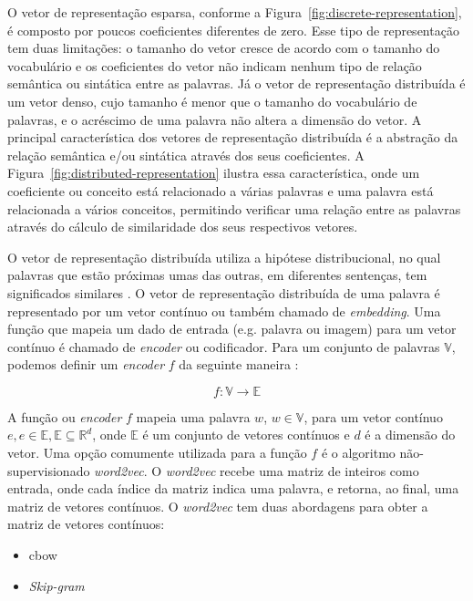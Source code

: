 O vetor de representação esparsa, conforme a Figura~\ref{fig:discrete-representation}, é composto por poucos coeficientes diferentes de zero. Esse tipo de representação tem duas limitações: o tamanho do vetor cresce de acordo com o tamanho do vocabulário e os coeficientes do vetor não indicam nenhum tipo de relação semântica ou sintática entre as palavras. Já o vetor de representação distribuída é um vetor denso, cujo tamanho é menor que o tamanho do vocabulário de palavras, e o acréscimo de uma palavra não altera a dimensão do vetor. A principal característica dos vetores de representação distribuída é a abstração da relação semântica e/ou sintática através dos seus coeficientes. A Figura~\ref{fig:distributed-representation} ilustra essa característica, onde um coeficiente ou conceito está relacionado a várias palavras e uma palavra está relacionada a vários conceitos, permitindo verificar uma relação entre as palavras através do cálculo de similaridade dos seus respectivos vetores.

 O vetor de representação distribuída utiliza a hipótese distribucional, no qual palavras que estão próximas umas das outras, em diferentes sentenças, tem significados similares \citep{Goodfellow-et-al-2016}. O vetor de representação distribuída de uma palavra é representado por um vetor contínuo ou também chamado de \textit{embedding}. Uma função que mapeia um dado de entrada (e.g. palavra ou imagem) para um vetor contínuo é chamado de \textit{encoder} ou codificador. Para um conjunto de palavras $\mathbb{V}$, podemos definir um \textit{encoder} $f$ da seguinte maneira \citep{cambronero-deep-learning-code-search:2019}:

\begin{equation}
    f: \mathbb{V} \rightarrow \mathbb{E}
\end{equation}

A função ou \textit{encoder} $f$ mapeia uma palavra $w$, $w \in \mathbb{V}$, para um vetor contínuo $e, e \in \mathbb{E}, \mathbb{E }\subseteq \mathbb{R}^{d}$, onde $\mathbb{E}$ é um conjunto de vetores contínuos e $d$ é a dimensão do vetor. Uma opção comumente utilizada para a função $f$ é o algoritmo não-supervisionado \textit{word2vec}. O \textit{word2vec} recebe uma matriz de inteiros como entrada, onde cada índice da matriz indica uma palavra, e retorna, ao final, uma matriz de vetores contínuos. O \textit{word2vec} tem duas abordagens para obter a matriz de vetores contínuos:

\begin{itemize}
    \item \acrfull{cbow}
    \item \textit{Skip-gram}
\end{itemize}
 
